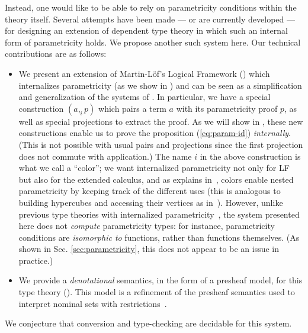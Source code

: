 \documentclass[english]{PaperTools/latex/entcs}
\theoremstyle{plain}
\theoremstyle{definition}
\theoremstyle{remark}
\newcommand\CP[3]{(#2,_{#1} #3)}
\begin{document}
Instead, one would like to be able to rely on parametricity conditions
within the theory itself.  Several attempts have been made
\citep{bernardy_computational_2012,bernardy_type-theory_2013} --- or are currently
developed \citep{altenkirch2014syntax} ---
for designing an extension of dependent type theory in which such an internal form of
parametricity holds. We propose another such system here.
Our technical contributions are as follows:
\begin{itemize}
\item We present an extension of Martin-Löf's Logical Framework
  () which internalizes parametricity (as we show in )
  and can be seen as a simplification and generalization of the systems of
  \citet{bernardy_computational_2012,bernardy_type-theory_2013}.
  In particular, we have a special construction $\CP i a p$ which pairs
  a term $a$ with its parametricity proof $p$, as well as special
  projections to extract the proof.  As we will show in ,
  these new constructions enable us to prove the proposition
  (\ref{eq:param-id}) \emph{internally}.  (This is not possible with
  usual pairs and projections since the first projection does not commute
  with application.)
  The name $i$ in the above construction is what we call a “color”;
  we want internalized parametricity not only for LF but also for the
  extended calculus, and as explains
  in~\cite{bernardy_type-theory_2013}, colors enable nested
  parametricity by keeping track of the different uses
  (this is analogous to building hypercubes and accessing
  their vertices as in~\citep{bernardy_computational_2012}).
  However, unlike previous type theories with internalized
  parametricity~\citep{bernardy_computational_2012, bernardy_type-theory_2013}, the
  system presented here does not \emph{compute} parametricity types:
  for instance, parametricity conditions are \emph{isomorphic to}
  functions, rather than functions themselves.  (As shown in
  Sec. \ref{sec:parametricity}, this does not appear to be an issue in
  practice.)
\item We provide a \emph{denotational} semantics, in the form of a presheaf model, for this type theory ().
      This model is a refinement of the presheaf semantics used to
      interpret nominal sets with
      restrictions~\citep{bezem2014model,DBLP:journals/corr/Pitts14}.
\end{itemize}
We conjecture that conversion and type-checking are decidable for this system.
\end{document}
